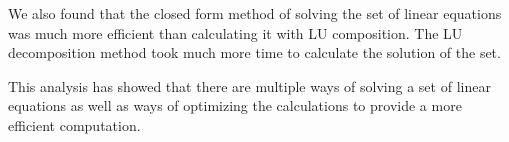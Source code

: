 \documentclass[10pt,showpacs,preprintnumbers,footinbib,amsmath,amssymb,aps,prl,twocolumn,groupedaddress,superscriptaddress,showkeys]{revtex4-1}
\begin{document}
	We also found that the closed form method of solving the set of linear equations was much more efficient than calculating it with LU composition.  The LU decomposition method took much more time to calculate the solution of the set.
	
	This analysis has showed that there are multiple ways of solving a set of linear equations as well as ways of optimizing the calculations to provide a more efficient computation.
	
	
	
	
	
	
	
	
	
	
	
	
	
	
\end{document}
